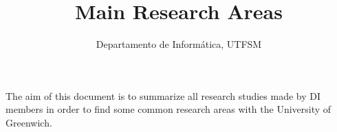 \documentclass[12pt,reqno]{amsart}
\title{Main Research Areas}
\author{Departamento de Inform\'atica, UTFSM}
\begin{document}
\maketitle

The aim of this document is to summarize all research studies made by DI
members in order to find some common research areas with the University of
Greenwich.











%

\end{document}
